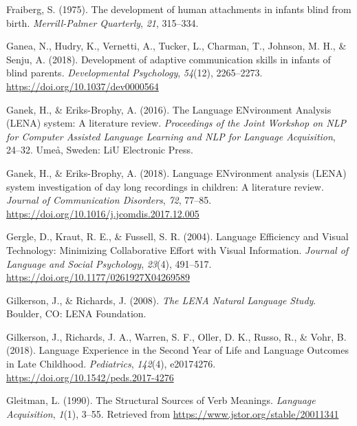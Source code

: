 \documentclass[
  man,floatsintext]{apa6}
\newlength{\cslhangindent}
\newlength{\cslentryspacingunit} %
\newenvironment{CSLReferences}[2] %
 {%
  \setlength{\parindent}{0pt}
  \ifodd #1
  \let\oldpar\par
  \def\par{\hangindent=\cslhangindent\oldpar}
  \fi
  \setlength{\parskip}{#2\cslentryspacingunit}
 }%
 {}
\begin{document}
\begin{CSLReferences}{1}{0}
\leavevmode{}%
Fraiberg, S. (1975). The development of human attachments in infants blind from birth. \emph{Merrill-Palmer Quarterly}, \emph{21}, 315--334.

\leavevmode{}%
Ganea, N., Hudry, K., Vernetti, A., Tucker, L., Charman, T., Johnson, M. H., \& Senju, A. (2018). Development of adaptive communication skills in infants of blind parents. \emph{Developmental Psychology}, \emph{54}(12), 2265--2273. \url{https://doi.org/10.1037/dev0000564}

\leavevmode{}%
Ganek, H., \& Eriks-Brophy, A. (2016). The {Language ENvironment Analysis} ({LENA}) system: {A} literature review. \emph{Proceedings of the Joint Workshop on {NLP} for {Computer Assisted Language Learning} and {NLP} for {Language Acquisition}}, 24--32. Ume{å}, Sweden: LiU Electronic Press.

\leavevmode{}%
Ganek, H., \& Eriks-Brophy, A. (2018). Language {ENvironment} analysis ({LENA}) system investigation of day long recordings in children: {A} literature review. \emph{Journal of Communication Disorders}, \emph{72}, 77--85. \url{https://doi.org/10.1016/j.jcomdis.2017.12.005}

\leavevmode{}%
Gergle, D., Kraut, R. E., \& Fussell, S. R. (2004). Language {Efficiency} and {Visual Technology}: {Minimizing Collaborative Effort} with {Visual Information}. \emph{Journal of Language and Social Psychology}, \emph{23}(4), 491--517. \url{https://doi.org/10.1177/0261927X04269589}

\leavevmode{}%
Gilkerson, J., \& Richards, J. (2008). \emph{The {LENA Natural Language Study}}. Boulder, CO: LENA Foundation.

\leavevmode{}%
Gilkerson, J., Richards, J. A., Warren, S. F., Oller, D. K., Russo, R., \& Vohr, B. (2018). Language {Experience} in the {Second Year} of {Life} and {Language Outcomes} in {Late Childhood}. \emph{Pediatrics}, \emph{142}(4), e20174276. \url{https://doi.org/10.1542/peds.2017-4276}

\leavevmode{}%
Gleitman, L. (1990). The {Structural Sources} of {Verb Meanings}. \emph{Language Acquisition}, \emph{1}(1), 3--55. Retrieved from \url{https://www.jstor.org/stable/20011341}


\end{CSLReferences}
\end{document}
